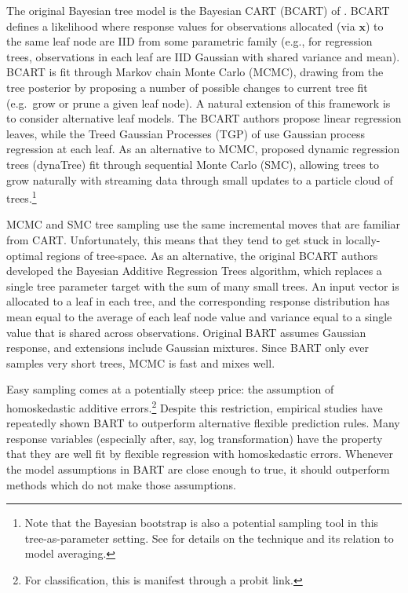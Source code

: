 \documentclass{article}
\begin{document}
The original Bayesian tree model is the Bayesian CART (BCART) of
\citet{chipman_bayesian_1998}.
BCART defines a likelihood where response values for  observations  allocated
(via $\mathbf{x}$) to the same leaf node are IID from some parametric family
(e.g., for regression trees, observations in each leaf are IID Gaussian with
shared variance and mean).   BCART is fit through Markov chain Monte Carlo (MCMC), drawing from the
tree posterior by proposing a number of possible
changes to current tree fit (e.g.~grow or prune a given leaf node). A natural
extension of this framework is to consider alternative leaf models. The  BCART
authors propose linear regression leaves, while the Treed Gaussian
Processes (TGP) of \citet{gramacy_bayesian_2008} use Gaussian process
regression at each leaf. As an alternative to MCMC,
\citet{taddy_dynamic_2011} proposed dynamic regression trees (dynaTree)
fit through sequential Monte Carlo (SMC), allowing trees to grow naturally
with streaming data through small updates to a particle cloud of
trees.\footnote{Note that the Bayesian bootstrap is also a potential sampling
tool in this tree-as-parameter setting. See \citet{clyde_bagging_2001} for
details on the technique and its relation to model averaging.}

MCMC and SMC tree sampling use the same incremental moves that are familiar
from CART. Unfortunately, this means that they tend to get stuck in
locally-optimal regions of tree-space.  As an alternative,
the original BCART authors developed the Bayesian Additive Regression Trees
\citep[BART;][]{chipman_bart:_2010} algorithm, which replaces a single tree
parameter target with the sum of many small trees. An input vector is
allocated to a leaf in each  tree, and the corresponding response
distribution has mean equal to the average of each leaf node value and
variance equal to a single  value that is shared across observations. Original
BART assumes Gaussian response, and extensions include Gaussian mixtures. Since BART
only ever samples very short trees, MCMC is fast and mixes well.  

Easy
sampling comes at a potentially steep price: the assumption of homoskedastic
additive errors.\footnote{For classification, this is manifest  through a
probit link.} Despite this restriction, empirical studies have repeatedly shown BART to outperform
alternative flexible prediction rules. Many response variables 
(especially after, say, log transformation) have the property that they are well fit by
 flexible regression with homoskedastic errors.  Whenever the model
 assumptions in BART are close enough to true, it should outperform  methods which do not make those assumptions.  
\end{document}
